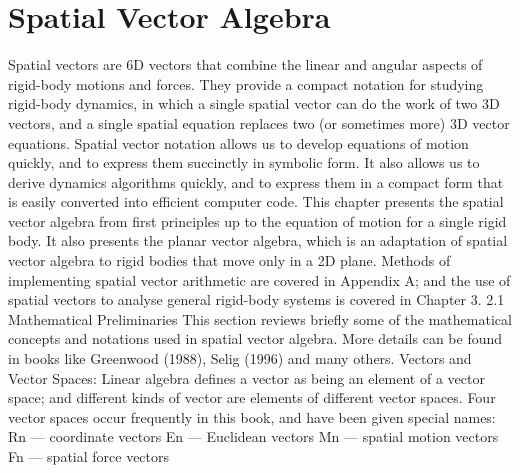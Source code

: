 \chapter{Spatial Vector Algebra}
\label{chap:2}
Spatial vectors are 6D vectors that combine the linear and angular aspects of rigid-body motions and forces. They provide a compact notation for studying rigid-body dynamics, in which a single spatial vector can do the work of two 3D vectors, and a single spatial equation replaces two (or sometimes more) 3D vector equations. Spatial vector notation allows us to develop equations of motion quickly, and to express them succinctly in symbolic form. It also allows us to derive dynamics algorithms quickly, and to express them in a compact form that is easily converted into efficient computer code. This chapter presents the spatial vector algebra from first principles up to the equation of motion for a single rigid body. It also presents the planar vector algebra, which is an adaptation of spatial vector algebra to rigid bodies that move only in a 2D plane. Methods of implementing spatial vector arithmetic are covered in Appendix A; and the use of spatial vectors to analyse general rigid-body systems is covered in Chapter 3. 2.1 Mathematical Preliminaries This section reviews briefly some of the mathematical concepts and notations used in spatial vector algebra. More details can be found in books like Greenwood (1988), Selig (1996) and many others. Vectors and Vector Spaces: Linear algebra defines a vector as being an element of a vector space; and different kinds of vector are elements of different vector spaces. Four vector spaces occur frequently in this book, and have been given special names: Rn — coordinate vectors En — Euclidean vectors Mn — spatial motion vectors Fn — spatial force vectors

